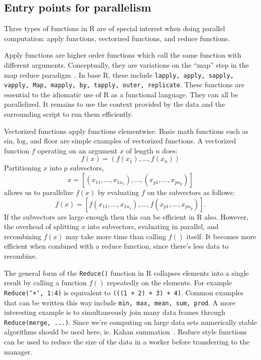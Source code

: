\documentclass[12pt]{article}
\begin{document}
\subsection{Entry points for parallelism}

\label{sec:parallel_points}

Three types of functions in R are of special interest when doing parallel
computation: apply functions, vectorized functions, and reduce functions.

Apply functions are higher order functions which call the same function
with different arguments. Conceptually, they are variations on the ``map''
step in the map reduce paradigm~\cite{dean2008mapreduce}.  In base R, these
include \texttt{lapply, apply, sapply, vapply, Map, mapply, by, tapply,
outer, replicate}. These functions are essential to the idiomatic use of R
as a functional language. They can all be parallelized. It remains to use
the context provided by the data and the surrounding script to run
them efficiently. 

Vectorized functions apply functions elementwise. Basic math functions such
as sin, log, and floor are simple examples of vectorized functions.  A
vectorized function $f$ operating on an argument $x$ of length $n$ does:
\begin{equation}
\label{eq:vectorization}
    f(x) = (f(x_1), \dots, f(x_n))
\end{equation}
Partitioning $x$ into $p$ subvectors, 
\[
    x = \left[ (x_{11}, \dots, x_{1 n_1}), \dots, (x_{p 1}, \dots, x_{p
n_p}) \right]
\]
allows us to parallelize $f(x)$ by evaluating $f$ on the subvectors as follows:
\[
    f(x) = \left[ f(x_{11}, \dots, x_{1 n_1}), \dots, f(x_{p 1}, \dots, x_{p
n_p}) \right].
\]
If the subvectors are large enough then this can be efficient in R also.
However, the overhead of splitting $x$ into subvectors, evaluating in
parallel, and recombining $f(x)$ may take more time than calling $f()$
itself. It becomes more efficient when combined with a reduce function,
since there's less data to recombine.

The general form of the \texttt{Reduce()} function in R collapses elements
into a single result by calling a function $f()$ repeatedly on the
elements. For example \texttt{Reduce(`+`, 1:4)} is equivalent to
\texttt{(((1 + 2) + 3) + 4)}. Common examples that can be written this way
include \texttt{min, max, mean, sum, prod}. A more interesting example is
to simultaneously join many data frames through \texttt{Reduce(merge,
...)}.  Since we're computing on large data sets numerically stable
algorithms should be used here, ie.  Kahan summation~\cite{Robey2011217}.
Reduce style functions can be used to reduce the size of the data in a
worker before transferring to the manager.
\end{document}
